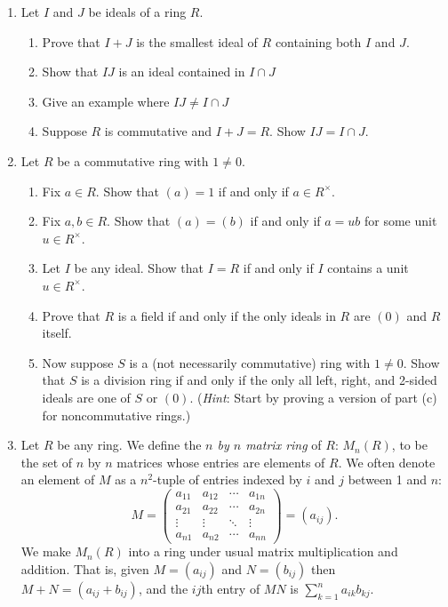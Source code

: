 \documentclass[11pt]{article}
\begin{document}
\begin{enumerate}
{  }
  \item{
  Let $I$ and $J$ be ideals of a ring $R$.
  \begin{enumerate}
    \item{Prove that $I+J$ is the smallest ideal of $R$ containing both $I$ and $J$.}
    \item{Show that $IJ$ is an ideal contained in $I\cap J$}
    \item{Give an example where $IJ\not=I\cap J$}
    \item{Suppose $R$ is commutative and $I+J=R$.  Show $IJ=I\cap J$.}
  \end{enumerate}
  }
  \item{
  Let $R$ be a commutative ring with $1\not=0$.
  \begin{enumerate}
    \item{
    Fix $a\in R$.  Show that $(a)=1$ if and only if $a\in R^\times$.
    }
    \item{
    Fix $a,b\in R$.  Show that $(a)=(b)$ if and only if $a = ub$ for some unit $u\in R^\times$.
    }
    \item{
    Let $I$ be any ideal.  Show that $I=R$ if and only if $I$ contains a unit $u\in R^\times$.
    }
    \item{
    Prove that $R$ is a field if and only if the only ideals in $R$ are $(0)$ and $R$ itself.
    }
    \item{
    Now suppose $S$ is a (not necessarily commutative) ring with $1\not=0$.  Show that $S$ is a division ring if and only if the only all left, right, and 2-sided ideals are one of $S$ or $(0)$.  (\textit{Hint}: Start by proving a version of part (c) for noncommutative rings.)
    }
  \end{enumerate}
  }
  \item{
  Let $R$ be any ring.  We define the \textit{$n$ by $n$ matrix ring} of $R$: $M_n(R)$, to be the set of $n$ by $n$ matrices whose entries are elements of $R$.  We often denote an element of $M$ as a $n^2$-tuple of entries indexed by $i$ and $j$ between 1 and $n$:
  \[M =
  \begin{pmatrix}
    a_{11} & a_{12} & \cdots & a_{1n}\\
    a_{21} & a_{22} & \cdots & a_{2n}\\
    \vdots & \vdots & \ddots & \vdots\\
    a_{n1} & a_{n2} & \cdots & a_{nn}
  \end{pmatrix}
  = (a_{ij}).
  \]
  We make $M_n(R)$ into a ring under usual matrix multiplication and addition.  That is, given $M = (a_{ij})$ and $N=(b_{ij})$ then $M+N=(a_{ij}+b_{ij})$, and the $ij$th entry of $MN$ is $\sum_{k=1}^na_{ik}b_{kj}$.
}
\end{enumerate}
\end{document}
